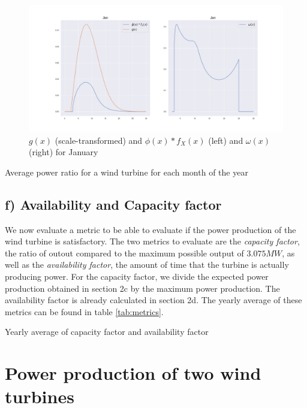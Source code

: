 \documentclass[a4paper]{article}
\begin{document}
\begin{figure}[H]
    \centering
    \includegraphics[width = 1.0\textwidth]{images/janPowerRatio}
    \caption{$g(x)$ (scale-transformed) and $\phi(x)*f_X(x)$ (left) and $\omega(x)$ (right) for January}
    \label{fig:janPowerRatio}
\end{figure}

\begin{table}[H]
    \centering
    \caption{Average power ratio for a wind turbine for each month of the year}
    \label{tab:powercoeff}
    
\end{table}

\subsection*{f) Availability and Capacity factor}
We now evaluate a metric to be able to evaluate if the power production of the wind turbine is satisfactory. The two metrics to evaluate are the \textit{capacity factor}, the ratio of outout compared to the maximum possible output of $3.075MW$, as well as the \textit{availability factor}, the amount of time that the turbine is actually producing power. For the capacity factor, we divide the expected power production obtained in section 2c by the maximum power production. The availability factor is already calculated in section 2d. The yearly average of these metrics can be found in table \ref{tab:metrics}.

\begin{table}[H]
    \centering
    \caption{Yearly average of capacity factor and availability factor}
    \label{tab:metrics}
    
\end{table}

\newpage
\section{Power production of two wind turbines}
\label{sec:twoTurbines}
\end{document}
